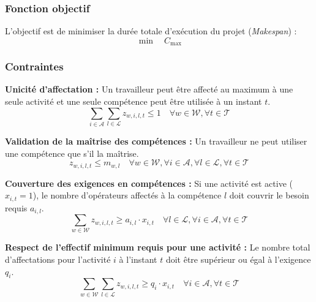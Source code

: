 \subsubsection{Fonction objectif}
L'objectif est de minimiser la durée totale d'exécution du projet (\textit{Makespan}) :
\begin{equation}
    \min \quad C_{\max}
\end{equation}

\subsubsection{Contraintes}

\noindent \textbf{Unicité d'affectation :} Un travailleur peut être affecté au maximum à une seule activité et une seule compétence peut être utilisée à un instant $t$.
\begin{equation}
    \sum_{i \in \mathcal{A}} \sum_{l \in \mathcal{L}} z_{w,i,l,t} \leq 1 \quad \forall w \in \mathcal{W}, \forall t \in \mathcal{T} \label{ilp_unicity}
\end{equation}

\noindent \textbf{Validation de la maîtrise des compétences :} Un travailleur ne peut utiliser une compétence que s'il la maîtrise.
\begin{equation}
    z_{w,i,l,t} \leq m_{w,l} \quad \forall w \in \mathcal{W}, \forall i \in \mathcal{A}, \forall l \in \mathcal{L}, \forall t \in \mathcal{T} \label{ilp_mastery}
\end{equation}

\noindent \textbf{Couverture des exigences en compétences :} Si une activité est active ($x_{i,t} = 1$), le nombre d'opérateurs affectés à la compétence $l$ doit couvrir le besoin requis $a_{i,l}$.
\begin{equation}
    \sum_{w \in \mathcal{W}} z_{w,i,l,t} \geq a_{i,l} \cdot x_{i,t} \quad \forall l \in \mathcal{L}, \forall i \in \mathcal{A}, \forall t \in \mathcal{T} \label{ilp_cov}
\end{equation}

\noindent \textbf{Respect de l'effectif minimum requis pour une activité :} Le nombre total d'affectations pour l'activité $i$ à l'instant $t$ doit être supérieur ou égal à l'exigence $q_i$.
\begin{equation}
    \sum_{w \in \mathcal{W}} \sum_{l \in \mathcal{L}} z_{w,i,l,t} \geq q_i \cdot x_{i,t} \quad \forall i \in \mathcal{A}, \forall t \in \mathcal{T} \label{ilp_min_w}
\end{equation}

